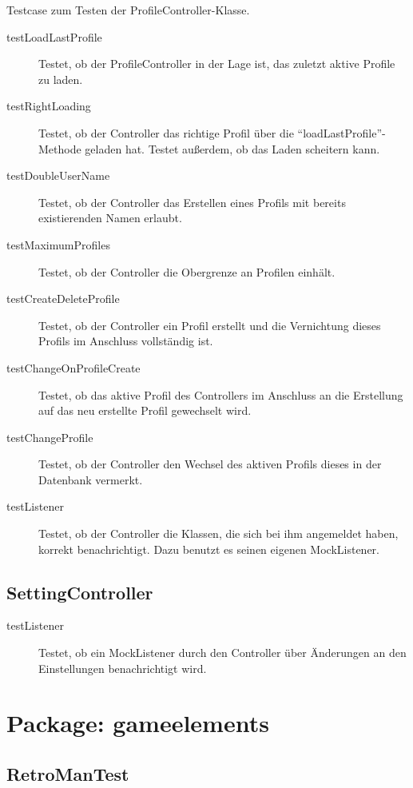 \documentclass[parskip=full]{scrreprt}
\begin{document}
Testcase zum Testen der ProfileController-Klasse.

\begin{description}
	\item[testLoadLastProfile] Testet, ob der ProfileController in der Lage ist, das zuletzt aktive Profile zu laden.
	\item[testRightLoading] Testet, ob der Controller das richtige Profil über die \enquote{loadLastProfile}-Methode geladen hat. Testet außerdem, ob das Laden scheitern kann.
	\item[testDoubleUserName] Testet, ob der Controller das Erstellen eines Profils mit bereits existierenden Namen erlaubt.
	\item[testMaximumProfiles] Testet, ob der Controller die Obergrenze an Profilen einhält.
	\item[testCreateDeleteProfile] Testet, ob der Controller ein Profil erstellt und die Vernichtung dieses Profils im Anschluss vollständig ist.
	\item[testChangeOnProfileCreate] Testet, ob das aktive Profil des Controllers im Anschluss an die Erstellung auf das neu erstellte Profil gewechselt wird.
	\item[testChangeProfile] Testet, ob der Controller den Wechsel des aktiven Profils dieses in der Datenbank vermerkt.
	\item[testListener] Testet, ob der Controller die Klassen, die sich bei ihm angemeldet haben, korrekt benachrichtigt. Dazu benutzt es seinen eigenen MockListener.
\end{description}

\subsection{SettingController}

\begin{description}
	\item [testListener] Testet, ob ein MockListener durch den Controller über Änderungen an den Einstellungen benachrichtigt wird.
\end{description}

\section{Package: gameelements}

\subsection{RetroManTest}
\end{document}
